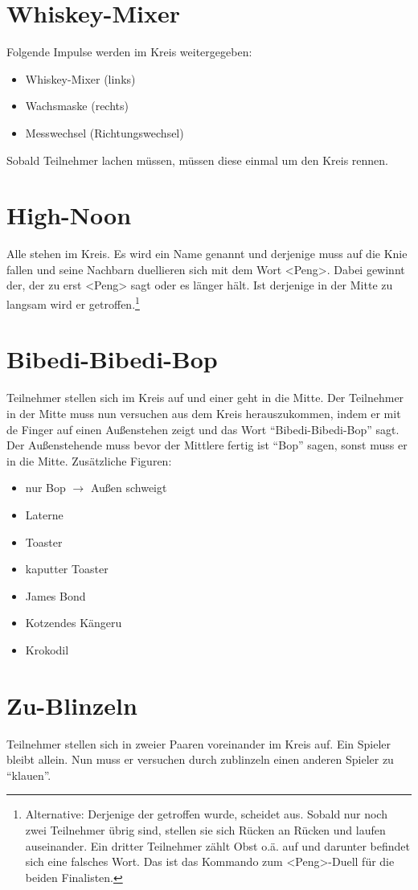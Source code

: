 \documentclass[ngerman, a4paper, twoside]{scrbook}%
\begin{document}
	\section{Whiskey-Mixer}
	Folgende Impulse werden im Kreis weitergegeben:
	\begin{itemize}
		\item Whiskey-Mixer (links)
		\item Wachsmaske (rechts)
		\item Messwechsel (Richtungswechsel)
	\end{itemize}
	Sobald Teilnehmer lachen müssen, müssen diese einmal um den Kreis rennen.
	\section{High-Noon}
	Alle stehen im Kreis. Es wird ein Name genannt und derjenige muss auf die Knie fallen und seine Nachbarn duellieren sich mit dem Wort <Peng>. Dabei gewinnt der, der zu erst <Peng> sagt oder es länger hält. Ist derjenige in der Mitte zu langsam wird er getroffen.\footnote{Alternative: Derjenige der getroffen wurde, scheidet aus. Sobald nur noch zwei Teilnehmer übrig sind, stellen sie sich Rücken an Rücken und laufen auseinander. Ein dritter Teilnehmer zählt Obst o.ä. auf und darunter befindet sich eine falsches Wort. Das ist das Kommando zum <Peng>-Duell für die beiden Finalisten.}
	\section{Bibedi-Bibedi-Bop}
	Teilnehmer stellen sich im Kreis auf und einer geht in die Mitte. Der Teilnehmer in der Mitte muss nun versuchen aus dem Kreis herauszukommen, indem er mit de Finger auf einen Außenstehen zeigt und das Wort "`Bibedi-Bibedi-Bop"' sagt. Der Außenstehende muss bevor der Mittlere fertig ist "`Bop"' sagen, sonst muss er in die Mitte. Zusätzliche Figuren:
	\begin{itemize}
		\item nur Bop $\rightarrow$ Außen schweigt
		\item Laterne
		\item Toaster
		\item kaputter Toaster
		\item James Bond
		\item Kotzendes Kängeru
		\item Krokodil
	\end{itemize}
	\section{Zu-Blinzeln}
	Teilnehmer stellen sich in zweier Paaren voreinander im Kreis auf. Ein Spieler bleibt allein. Nun muss er versuchen durch zublinzeln einen anderen Spieler zu "`klauen"'.
\end{document}
